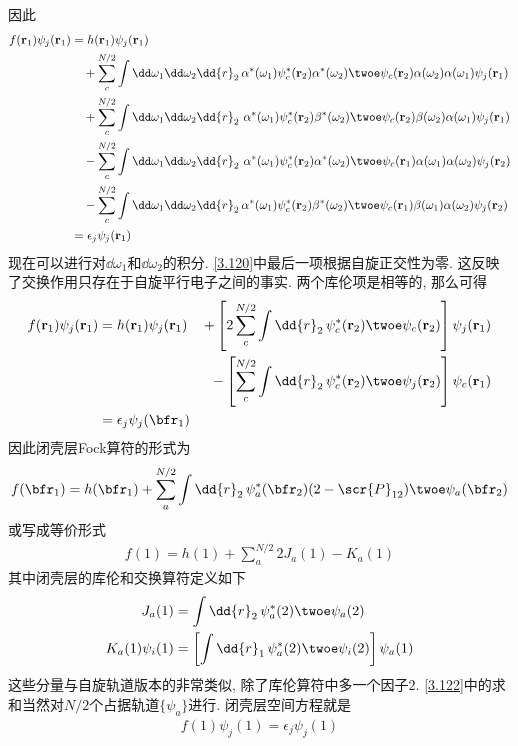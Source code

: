 因此
\begin{align}
	f(\mathbf{r}_1)\psi_j(\mathbf{r}_1) & = h(\mathbf{r}_1)\psi_j(\mathbf{r}_1)\notag\\
	& {}\quad + \sum_c^{N/2}\int\dd\omega_1\dd\omega_2\dd{r}_2\,\alpha^*(\omega_1)\psi_c^*(\mathbf{r}_2)\alpha^*(\omega_2)\twoe\psi_c(\mathbf{r}_2)\alpha(\omega_2)\alpha(\omega_1)\psi_j(\mathbf{r}_1)\notag\\
	& {}\quad + \sum_c^{N/2}\int\dd\omega_1\dd\omega_2\dd{r}_2\,\,\alpha^*(\omega_1)\psi_c^*(\mathbf{r}_2)\beta^*(\omega_2)\twoe\psi_c(\mathbf{r}_2)\beta(\omega_2)\alpha(\omega_1)\psi_j(\mathbf{r}_1)\notag\\
	& {}\quad - \sum_c^{N/2}\int\dd\omega_1\dd\omega_2\dd{r}_2\,\,\alpha^*(\omega_1)\psi_c^*(\mathbf{r}_2)\alpha^*(\omega_2)\twoe\psi_c(\mathbf{r}_1)\alpha(\omega_1)\alpha(\omega_2)\psi_j(\mathbf{r}_2)\notag\\
	& {}\quad - \sum_c^{N/2}\int\dd\omega_1\dd\omega_2\dd{r}_2\,\alpha^*(\omega_1)\psi_c^*(\mathbf{r}_2)\beta^*(\omega_2)\twoe\psi_c(\mathbf{r}_1)\beta(\omega_1)\alpha(\omega_2)\psi_j(\mathbf{r}_2)\notag\\
	& = \epsilon_j\psi_j(\mathbf{r}_1)
	\label{3.120}
\end{align}
现在可以进行对$\dd\omega_1$和$\dd\omega_2$的积分. 
\autoref{3.120}中最后一项根据自旋正交性为零. 
这反映了交换作用只存在于自旋平行电子之间的事实. 
两个库伦项是相等的, 
那么可得
\begin{alignat}{3}
	f(\mathbf{r}_1)\psi_j(\mathbf{r}_1) 
	& = h(\mathbf{r}_1)\psi_j(\mathbf{r}_1) & + \left[ 2\sum_c^{N/2}\int\dd{r}_2\,\psi_c^*(\mathbf{r}_2)\twoe\psi_c(\mathbf{r}_2)\right]\psi_j(\mathbf{r}_1)\notag\\
	&                                       & - \left[  \sum_c^{N/2}\int\dd{r}_2\,\psi_c^*(\mathbf{r}_2)\twoe\psi_j(\mathbf{r}_2)\right]\psi_c(\mathbf{r}_1)\notag\\
	& = \epsilon_j\psi_j(\bfr_1)&
\end{alignat}
因此闭壳层Fock算符的形式为
\begin{align}
	\label{3.122}
	f(\bfr_1) = h(\bfr_1) + \sum_a^{N/2}\int\dd{r}_2\,\psi_a^*(\bfr_2)(2-\scr{P}_{12})\twoe\psi_a(\bfr_2)
\end{align}
或写成等价形式
\begin{align}
	f(1) = h(1) + \sum_a^{N/2} 2J_a(1) - K_a(1)
\end{align}
其中闭壳层的库伦和交换算符定义如下
\begin{align}
	J_a(1) & = \int\dd{r}_2\,\psi_a^*(2)\twoe\psi_a(2) \label{3.124}\\
	K_a(1) \psi_i(1) & = \left[ \int\dd{r}_1\,\psi_a^*(2)\twoe\psi_i(2) \right]\psi_a(1) \label{3.125}
\end{align}
这些分量与自旋轨道版本的非常类似, 
除了库伦算符中多一个因子$2$. 
\autoref{3.122}中的求和当然对$N/2$个占据轨道$\{\psi_a\}$进行. 
闭壳层空间\hft 方程就是
\begin{align}
	f(1)\psi_j(1) = \epsilon_j\psi_j(1)
\end{align}

